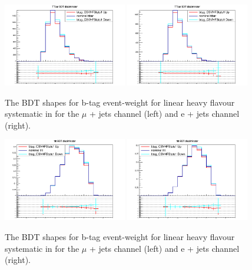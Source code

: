 \begin{figure}[ht!]
    \includegraphics[width=0.48\textwidth]{images/Run2/Sys/btag_CSVHFStats1systt.png}
    \includegraphics[width=0.48\textwidth]{images/Run2/Sys/btag_CSVHFStats1systt_e.png}     
    \caption{The BDT shapes for b-tag event-weight for linear heavy flavour systematic in \ttbar for the $\mu$ + jets channel (left) and e + jets channel (right).}
    \label{fig:SysShapesHFStatstt1}
\end{figure}
\begin{figure}[ht!]
    \includegraphics[width=0.48\textwidth]{images/Run2/Sys/btag_CSVHFStats1systttt.png}
    \includegraphics[width=0.48\textwidth]{images/Run2/Sys/btag_CSVHFStats1systttt_e.png}     
    \caption{The BDT shapes for b-tag event-weight for linear heavy flavour systematic in \tttt for the $\mu$ + jets channel (left) and e + jets channel (right).}
    \label{fig:SysShapesHFStatstttt1}
\end{figure}
